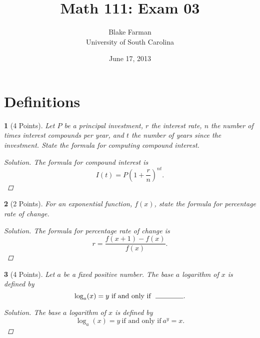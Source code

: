 \documentclass[12pt]{amsart}
\author{Blake Farman\\University of South Carolina}
\title{Math 111: Exam 03}
\date{June 17, 2013}
\begin{document}
\maketitle

\begin{center}
\end{center}

\vspace{0.2in}
\vspace{0.2in}

\theoremstyle{plain}
\newtheorem{thm}{}
\newtheorem{lem}{Lemma}
\theoremstyle{definition}
\newtheorem{defn}{Definition}

\section{Definitions}
\begin{thm}[4 Points]\label{ex1}
  Let $P$ be a principal investment, $r$ the interest rate, $n$ the number of times interest compounds per year, and $t$ the number of years since the investment.
  State the formula for computing compound interest.
  
  \begin{proof}[Solution]
    The formula for compound interest is 
    $$I(t) = P\left(1 + \frac{r}{n}\right)^{nt}.$$
  \end{proof}
\end{thm}

\begin{thm}[2 Points]\label{ex2}
  For an exponential function, $f(x)$, state the formula for percentage rate of change.
  
  \begin{proof}[Solution]
    The formula for percentage rate of change is
    $$r = \frac{f(x + 1) - f(x)}{f(x)}.$$
  \end{proof}
\end{thm}

\begin{thm}[4 Points]\label{ex3}
  Let $a$ be a fixed positive number.
  The base $a$ logarithm of $x$ is defined by
  $$\log_a(x) = y\  \text{if and only if}\ \ \line(1,0){40}.$$
  
  \begin{proof}[Solution]
    The base $a$ logarithm of $x$ is defined by
    $$\log_a(x) = y\  \text{if and only if}\ a^y = x.$$
  \end{proof}
\end{thm}
\end{document}
